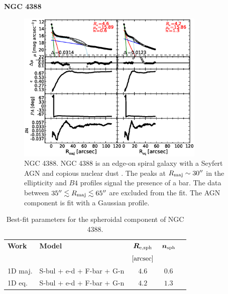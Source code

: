 \documentclass[preprint2]{emulateapj}
\newcommand{\fitfigurewidth}{0.8\textwidth}
\begin{document}
  \clearpage\newpage\noindent
  {\bf NGC 4388 \\}

  \begin{figure}[h]
  \begin{center}
  \includegraphics[width=\fitfigurewidth]{images/n4388_1Dfit.eps}
  \caption{NGC 4388.
  NGC 4388 is an edge-on spiral galaxy with a Seyfert AGN \citep{veroncettyveron2006} 
  and copious nuclear dust \citep{martini2003}.
  The peaks at $R_{\rm maj} \sim 30''$ in the ellipticity and $B4$ profiles signal the presence of a bar.
  The data between $35'' \lesssim R_{\rm maj} \lesssim 65''$ are excluded from the fit.
  The AGN component is fit with a Gaussian profile.
  }
  \end{center}
  \end{figure}

  \begin{table}[h]
  \small
  \caption{Best-fit parameters for the spheroidal component of NGC 4388.}
  \begin{center}
  \begin{tabular}{llccc}
  \hline
  {\bf Work} & {\bf Model}   & $\bm R_{\rm e,sph}$    & $\bm n_{\rm sph}$ \\
    &  &  $[\rm arcsec]$ & \\
  \hline
  1D maj. & S-bul + e-d + F-bar + G-n & $4.6$  &  $0.6$ \\
  1D eq.  & S-bul + e-d + F-bar + G-n & $4.2$  &  $1.3$ \\
  \hline
  \end{tabular}
  \end{center}
  \label{tab:n4388}
  \end{table}
\end{document}
